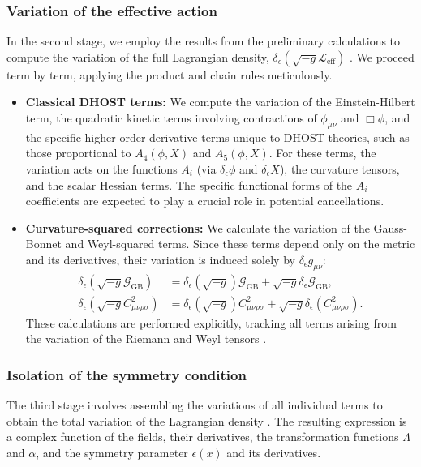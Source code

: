 \documentclass[twocolumn]{aastex631}
\begin{document}
\subsubsection{Variation of the effective action}
In the second stage, we employ the results from the preliminary calculations to compute the variation of the full Lagrangian density, $\delta_\epsilon(\sqrt{-g}\mathcal{L}_{\text{eff}})$ \citep{manoff2000lagrangianformalismtensorfields,bering2011noetherstheoremfixedregion}. We proceed term by term, applying the product and chain rules meticulously.
\begin{itemize}
    \item \textbf{Classical DHOST terms:} We compute the variation of the Einstein-Hilbert term, the quadratic kinetic terms involving contractions of $\phi_{\mu\nu}$ and $\Box\phi$, and the specific higher-order derivative terms unique to DHOST theories, such as those proportional to $A_4(\phi, X)$ and $A_5(\phi, X)$. For these terms, the variation acts on the functions $A_i$ (via $\delta_\epsilon \phi$ and $\delta_\epsilon X$), the curvature tensors, and the scalar Hessian terms. The specific functional forms of the $A_i$ coefficients are expected to play a crucial role in potential cancellations.
    \item \textbf{Curvature-squared corrections:} We calculate the variation of the Gauss-Bonnet and Weyl-squared terms. Since these terms depend only on the metric and its derivatives, their variation is induced solely by $\delta_\epsilon g_{\mu\nu}$:
    \begin{align}
    \delta_\epsilon(\sqrt{-g} \mathcal{G}_{\text{GB}}) &= \delta_\epsilon(\sqrt{-g}) \mathcal{G}_{\text{GB}} + \sqrt{-g} \delta_\epsilon \mathcal{G}_{\text{GB}}, \\
    \delta_\epsilon(\sqrt{-g} C_{\mu\nu\rho\sigma}^2) &= \delta_\epsilon(\sqrt{-g}) C_{\mu\nu\rho\sigma}^2 + \sqrt{-g} \delta_\epsilon (C_{\mu\nu\rho\sigma}^2).
    \end{align}
    These calculations are performed explicitly, tracking all terms arising from the variation of the Riemann and Weyl tensors \citep{martín2022pytearcatpythontensoralgebra,chung2023algebraicpropertiesriemannianmanifolds}.
\end{itemize}
\subsubsection{Isolation of the symmetry condition}
The third stage involves assembling the variations of all individual terms to obtain the total variation of the Lagrangian density \citep{wu1998generalgaugefieldtheory,bering2011noetherstheoremfixedregion}. The resulting expression is a complex function of the fields, their derivatives, the transformation functions $\Lambda$ and $\alpha$, and the symmetry parameter $\epsilon(x)$ and its derivatives.
\end{document}
